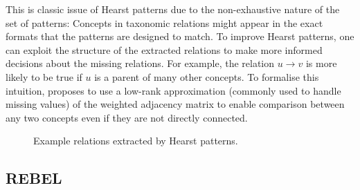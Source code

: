 This is classic issue of Hearst patterns due to the non-exhaustive nature of the set of patterns: Concepts in taxonomic relations might appear in the exact formats that the patterns are designed to match. To improve Hearst patterns, one can exploit the structure of the extracted relations to make more informed decisions about the missing relations. For example, the relation $u \to v$ is more likely to be true if $u$ is a parent of many other concepts. To formalise this intuition, \citet{roller2018hearst} proposes to use a low-rank approximation \cite{schmidt1907theorie} (commonly used to handle missing values) of the weighted adjacency matrix to enable comparison between any two concepts even if they are not directly connected. 


\begin{figure}
    \centering
    \caption{Example relations extracted by Hearst patterns.}
    \label{fig:hearst-example}
\end{figure}

\subsection{REBEL}

